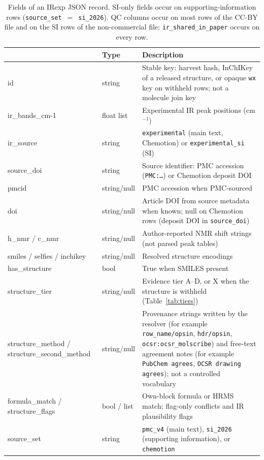 \documentclass[pdflatex,sn-nature]{sn-jnl}
\begin{document}
\begin{table}[!htbp]
\caption{Fields of an IRexp JSON record. SI-only fields occur on supporting-information rows (\texttt{source\_set}~$=$~\texttt{si\_2026}). QC columns occur on most rows of the CC-BY file and on the SI rows of the non-commercial file; \texttt{ir\_shared\_in\_paper} occurs on every row.}\label{tab:fields}
\scriptsize
\begin{tabular}{@{}>{\ttfamily\raggedright\arraybackslash}p{3.35cm}
  >{\raggedright\arraybackslash}p{1.55cm}
  >{\raggedright\arraybackslash}p{6.15cm}@{}}
\toprule
\multicolumn{1}{l}{Field} & Type & Description \\
\midrule
id & string & Stable key: harvest hash, InChIKey of a released structure, or opaque \texttt{wx} key on withheld rows; not a molecule join key \\
ir\_bands\_cm-1 & float list & Experimental IR peak positions (cm$^{-1}$) \\
ir\_source & string & \texttt{experimental} (main text, Chemotion) or \texttt{experimental\_si} (SI) \\
source\_doi & string & Source identifier: PMC accession (\texttt{PMC:\ldots}) or Chemotion deposit DOI \\
pmcid & string/null & PMC accession when PMC-sourced \\
doi & string/null & Article DOI from source metadata when known; null on Chemotion rows (deposit DOI in \texttt{source\_doi}) \\
h\_nmr / c\_nmr & string/null & Author-reported NMR shift strings (not parsed peak tables) \\
smiles / selfies / inchikey & string/null & Resolved structure encodings \\
has\_structure & bool & True when SMILES present \\
structure\_tier & string/null & Evidence tier A--D, or X when the structure is withheld (Table~\ref{tab:tiers}) \\
structure\_method / structure\_second\_\allowbreak method & string/null & Provenance strings written by the resolver (for example \texttt{row\_name/opsin}, \texttt{hdr/opsin}, \texttt{ocsr:ocsr\_molscribe}) and free-text agreement notes (for example \texttt{PubChem agrees}, \texttt{OCSR drawing agrees}); not a controlled vocabulary \\
formula\_match / structure\_flags & bool / list & Own-block formula or HRMS match; flag-only conflicts and IR plausibility flags \\
source\_set & string & \texttt{pmc\_v4} (main text), \texttt{si\_2026} (supporting information), or \texttt{chemotion} \\

\end{tabular}
\end{table}
\end{document}
